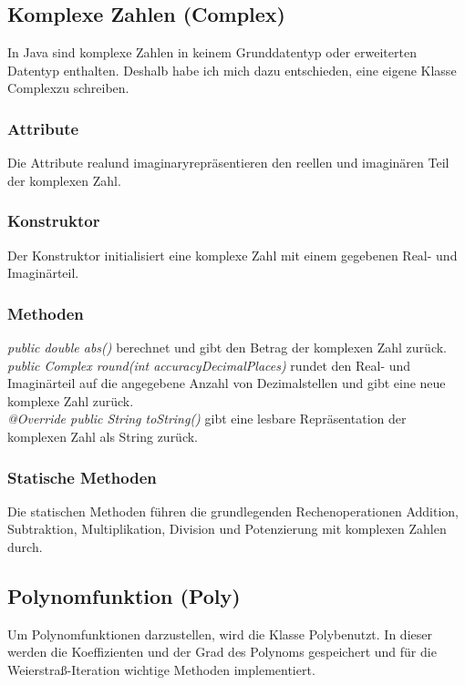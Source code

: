 \documentclass[12pt]{article}
\begin{document}
\subsection{Komplexe Zahlen (Complex)}
In Java sind komplexe Zahlen in keinem Grunddatentyp oder erweiterten Datentyp enthalten. Deshalb habe ich mich dazu entschieden, eine eigene Klasse \glqq Complex\grqq\space zu schreiben.

\subsubsection*{Attribute}
Die Attribute \glqq real\grqq\space und \glqq imaginary\grqq\space repräsentieren den reellen und imaginären Teil der komplexen Zahl.

\subsubsection*{Konstruktor}
Der Konstruktor initialisiert eine komplexe Zahl mit einem gegebenen Real- und Imaginärteil.

\subsubsection*{Methoden}
\textit{public double abs()} berechnet und gibt den Betrag der komplexen Zahl zurück.\\
\textit{public Complex round(int accuracyDecimalPlaces)} rundet den Real- und Imaginärteil auf die angegebene Anzahl von Dezimalstellen und gibt eine neue komplexe Zahl zurück.\\
\textit{@Override public String toString()} gibt eine lesbare Repräsentation der komplexen Zahl als String zurück.

\subsubsection*{Statische Methoden}
Die statischen Methoden führen die grundlegenden Rechenoperationen Addition, Subtraktion, Multiplikation, Division und Potenzierung mit komplexen Zahlen durch.

\subsection{Polynomfunktion (Poly)}
Um Polynomfunktionen darzustellen, wird die Klasse \glqq Poly\grqq\space benutzt. In dieser werden die Koeffizienten und der Grad des Polynoms gespeichert und für die Weierstraß-Iteration wichtige Methoden implementiert.
\end{document}

